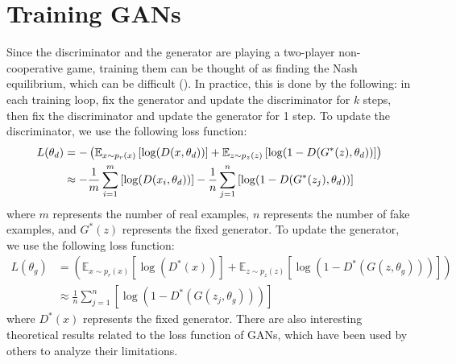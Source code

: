     \section{Training GANs}
    Since the discriminator and the generator are playing a two-player non-cooperative game, training them can be thought of as finding the Nash equilibrium, which can be difficult (\cite{salimans2016improved}). In practice, this is done by the following: in each training loop, fix the generator and update the discriminator for $k$ steps, then fix the discriminator and update the generator for 1 step. To update the discriminator, we use the following loss function\footnotemark{}:
    \begin{align}\label{eq:dis_loss}
        L(\theta_d) &= - \left(\mathbb{E}_{x\sim p_r(x)}\left[\log (D(x, \theta_d))\right] +\mathbb{E}_{z\sim p_z(z)}\left[\log(1- D(G^*(z), \theta_d))\right]\right)\notag\\
        &\approx -\frac{1}{m}\sum_{i=1}^m\left[\log (D(x_i, \theta_d))\right] - \frac{1}{n}\sum_{j=1}^n\left[\log(1-D(G^*(z_j), \theta_d))\right]
    \end{align}
    where $m$ represents the number of real examples, $n$ represents the number of fake examples, and $G^*(z)$ represents the fixed generator. To update the generator, we use the following loss function:
    \begin{align}\label{eq:gen_loss}
        L(\theta_g) &= \left(\mathbb{E}_{x\sim p_r(x)}\left[\log (D^*(x))\right] +\mathbb{E}_{z\sim p_z(z)}\left[\log(1- D^*(G(z, \theta_g)))\right]\right)\\
        &\approx \frac{1}{n}\sum_{j=1}^n\left[\log(1-D^*(G(z_j, \theta_g)))\right] \tag{first term is not related to $G(z, \theta_g)$}
    \end{align}
    where $D^*(x)$ represents the fixed generator. There are also interesting theoretical results related to the loss function of GANs, which have been used by others to analyze their limitations.
